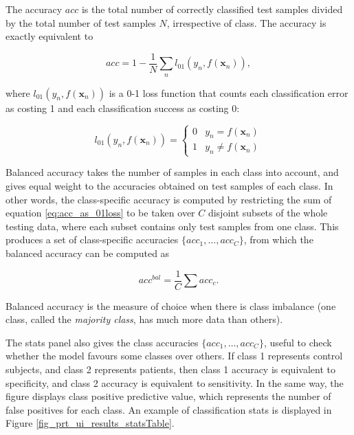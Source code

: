 The accuracy $acc$ is the total number of correctly classified test samples divided by the total number of test samples $N$, irrespective of class. The accuracy is exactly equivalent to 

\begin{equation}
\label{eq:acc_as_01loss}
acc = 1- \frac{1}{N} \sum_n l_{01}(y_n,f(\mathbf{x}_n)),
\end{equation}

where $l_{01}(y_n,f(\mathbf{x}_n))$ is a 0-1 loss function that 
counts each classification error as costing 1 and each classification success as costing 0:

\begin{equation}
l_{01}(y_n,f(\mathbf{x}_n)) = \left\{
\begin{array}{ll}
0 & y_n = f(\mathbf{x}_n)\\
1 & y_n \neq f(\mathbf{x}_n)
\end{array} \right.
\end{equation}


Balanced accuracy takes the number of samples in each class into account, and gives equal weight
to the accuracies obtained on test samples of each class. In other words, the class-specific accuracy is computed by restricting 
the sum of equation \ref{eq:acc_as_01loss} to be taken over $C$ disjoint subsets of the whole testing data,
where each subset contains only test samples from one class. This produces a set of class-specific
accuracies $\{acc_1, \ldots, acc_C\}$, from which the balanced accuracy can be computed as 

\begin{equation}
acc^{bal}=\frac{1}{C} \sum acc_c .
\end{equation}

Balanced accuracy is the measure of choice when there is class imbalance (one
class, called the \textit{majority class}, has much more data than others).

The stats panel also gives the class accuracies $\{acc_1, \ldots, acc_C\}$, useful
to check whether the model favours some classes over others. If class 1 represents control subjects, 
and class 2 represents patients, then class 1 accuracy is equivalent to specificity, and class 2 accuracy is 
equivalent to sensitivity. In the same way, the figure displays class positive predictive value, which represents the number of false positives for each class. An example of classification stats is displayed in Figure \ref{fig_prt_ui_results_statsTable}.

